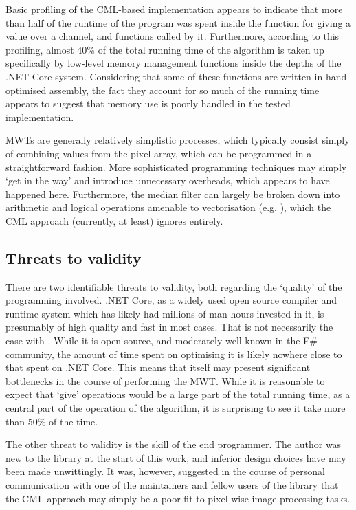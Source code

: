 Basic profiling of the CML-based implementation appears to indicate that more than half of the runtime of the program was spent inside the function for giving a value over a channel, and functions called by it.  Furthermore, according to this profiling, almost 40\% of the total running time of the algorithm is taken up specifically by low-level memory management functions inside the depths of the .NET Core system.  Considering that some of these functions are written in hand-optimised assembly, the fact they account for so much of the running time appears to suggest that memory use is poorly handled in the tested implementation.

MWTs are generally relatively simplistic processes, which typically consist simply of combining values from the pixel array, which can be programmed in a straightforward fashion.  More sophisticated programming techniques may simply `get in the way' and introduce unnecessary overheads, which appears to have happened here.  Furthermore, the median filter can largely be broken down into arithmetic and logical operations amenable to vectorisation (e.g. \cite{Sanchez2012,Perreault2007}), which the CML approach (currently, at least) ignores entirely.

\subsection{Threats to validity}
There are two identifiable threats to validity, both regarding the `quality' of the programming involved.  .NET Core, as a widely used open source compiler and runtime system which has likely had millions of man-hours invested in it, is presumably of high quality and fast in most cases.  That is not necessarily the case with \hopac{}.  While it is open source, and moderately well-known in the F\# community, the amount of time spent on optimising it is likely nowhere close to that spent on .NET Core.  This means that \hopac{} itself may present significant bottlenecks in the course of performing the MWT.  While it is reasonable to expect that `give' operations would be a large part of the total running time, as a central part of the operation of the algorithm, it is surprising to see it take more than 50\% of the time.

The other threat to validity is the skill of the end programmer.  The author was new to the \hopac{} library at the start of this work, and inferior design choices have may been made unwittingly.  It was, however, suggested in the course of personal communication with one of the maintainers and fellow users of the \hopac{} library that the CML approach may simply be a poor fit to pixel-wise image processing tasks.

